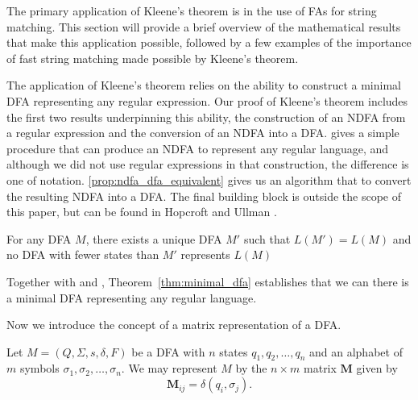 \documentclass{bcthesis}
\renewcommand{\meo}[1]{}
\newcommand{\pcite}[2]{\xspace\cite[pg.~{#2}]{#1}\xspace}
\begin{document}
	\meo{
		Figure out if there are any other parts of the proof that deserve an example to help explain them.
		I will probably include pictures for regular language $\iff$ representable in the initial proof.
	}


\label{sec:motivation}

	The primary application of Kleene's theorem is in the use of FAs for string matching.
	This section will provide a brief overview of the mathematical results that make this application possible, followed by a few examples of the importance of fast string matching made possible by Kleene's theorem.

	The application of Kleene's theorem relies on the ability to construct a minimal DFA representing any regular expression.
	Our proof of Kleene's theorem includes the first two results underpinning this ability, the construction of an NDFA from a regular expression and the conversion of an NDFA into a DFA. 
	 gives a simple procedure that can produce an NDFA to represent any regular language, and although we did not use regular expressions in that construction, the difference is one of notation.
	\ref{prop:ndfa_dfa_equivalent} gives us an algorithm that to convert the resulting NDFA into a DFA.
	The final building block is outside the scope of this paper, but can be found in Hopcroft and Ullman \pcite{hopcroft}{67--70}. 

	\begin{theorem}
	\label{thm:minimal_dfa}
		For any DFA $M$, there exists a unique DFA $M'$ such that $L(M') = L(M)$ and no DFA with fewer states than $M'$ represents $L(M)$
	\end{theorem}

	Together with  and , Theorem~\ref{thm:minimal_dfa} establishes that we can there is a minimal DFA representing any regular language.

	Now we introduce the concept of a matrix representation of a DFA.

	\begin{definition}
		Let $M = (Q, \Sigma, s, \delta, F)$ be a DFA with $n$ states $q_1, q_2, \dots, q_n$ and an alphabet of $m$ symbols $\sigma_1, \sigma_2, \dots, \sigma_n$.
		We may represent $M$ by the $n \times m$ matrix $\mathbf{M}$ given by 
		\[
			\mathbf{M}_{ij} = \delta(q_i, \sigma_j).
		\]
	\end{definition}
\end{document}
